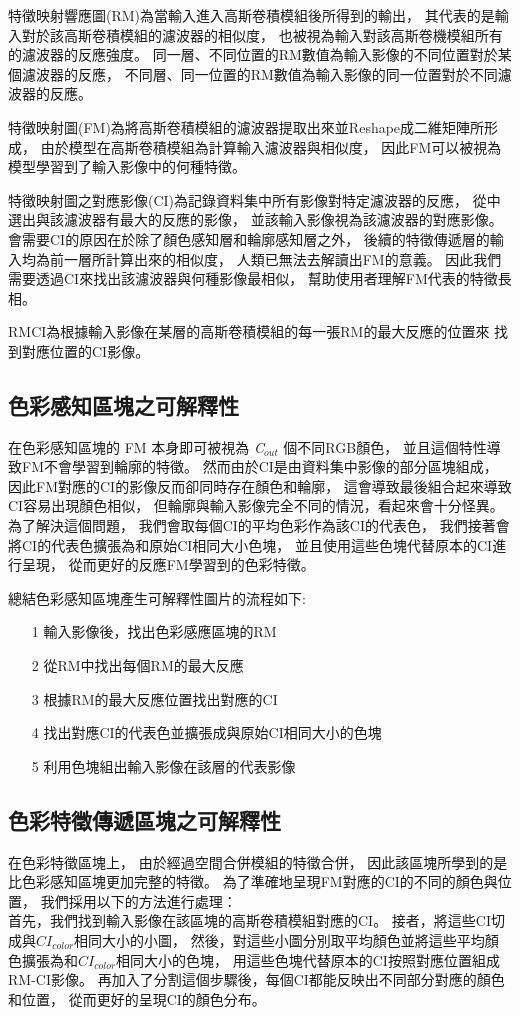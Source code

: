 \documentclass[class=NCU_thesis, crop=false]{standalone}
\begin{document}
	特徵映射響應圖(RM)為當輸入進入高斯卷積模組後所得到的輸出，
	其代表的是輸入對於該高斯卷積模組的濾波器的相似度，
	也被視為輸入對該高斯卷機模組所有的濾波器的反應強度。
	同一層、不同位置的RM數值為輸入影像的不同位置對於某個濾波器的反應，
	不同層、同一位置的RM數值為輸入影像的同一位置對於不同濾波器的反應。

	特徵映射圖(FM)為將高斯卷積模組的濾波器提取出來並Reshape成二維矩陣所形成，
	由於模型在高斯卷積模組為計算輸入濾波器與相似度，
	因此FM可以被視為模型學習到了輸入影像中的何種特徵。

	特徵映射圖之對應影像(CI)為記錄資料集中所有影像對特定濾波器的反應，
	從中選出與該濾波器有最大的反應的影像，
	並該輸入影像視為該濾波器的對應影像。
	會需要CI的原因在於除了顏色感知層和輪廓感知層之外，
	後續的特徵傳遞層的輸入均為前一層所計算出來的相似度，
	人類已無法去解讀出FM的意義。
	因此我們需要透過CI來找出該濾波器與何種影像最相似，
	幫助使用者理解FM代表的特徵長相。

	RM\-CI為根據輸入影像在某層的高斯卷積模組的每一張RM的最大反應的位置來
	找到對應位置的CI影像。

	\subsection{色彩感知區塊之可解釋性}
	在色彩感知區塊的 FM 本身即可被視為 \textit{C}$_{out}$ 個不同RGB顏色，
	並且這個特性導致FM不會學習到輪廓的特徵。
	然而由於CI是由資料集中影像的部分區塊組成，
	因此FM對應的CI的影像反而卻同時存在顏色和輪廓，
	這會導致最後組合起來導致CI容易出現顏色相似，
	但輪廓與輸入影像完全不同的情況，看起來會十分怪異。
	為了解決這個問題，
	我們會取每個CI的平均色彩作為該CI的代表色，
	我們接著會將CI的代表色擴張為和原始CI相同大小色塊，
	並且使用這些色塊代替原本的CI進行呈現，
	從而更好的反應FM學習到的色彩特徵。

	總結色彩感知區塊產生可解釋性圖片的流程如下:
	\begin{itemize}
		\item [1]
		輸入影像後，找出色彩感應區塊的RM
		\item [2]
		從RM中找出每個RM的最大反應
		\item [3]
		根據RM的最大反應位置找出對應的CI
		\item [4]
		找出對應CI的代表色並擴張成與原始CI相同大小的色塊
		\item [5]
		利用色塊組出輸入影像在該層的代表影像
	\end{itemize}

	\subsection{色彩特徵傳遞區塊之可解釋性}
	在色彩特徵區塊上，
	由於經過空間合併模組的特徵合併，
	因此該區塊所學到的是比色彩感知區塊更加完整的特徵。
	為了準確地呈現FM對應的CI的不同的顏色與位置，
	我們採用以下的方法進行處理：\\
	首先，我們找到輸入影像在該區塊的高斯卷積模組對應的CI。
	接者，將這些CI切成與$CI_{color}$相同大小的小圖，
	然後，對這些小圖分別取平均顏色並將這些平均顏色擴張為和$CI_{color}$相同大小的色塊，
	用這些色塊代替原本的CI按照對應位置組成RM-CI影像。
	再加入了分割這個步驟後，每個CI都能反映出不同部分對應的顏色和位置，
	從而更好的呈現CI的顏色分布。
\end{document}
